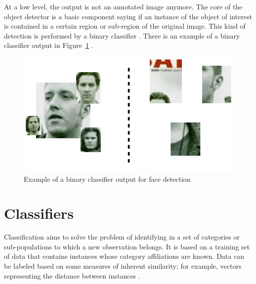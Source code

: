 \noindent At a low level, the output is not an annotated image anymore. The core of the object detector is a basic component saying if an instance of the object of interest is contained in a certain region or sub-region of the original image. This kind of detection is performed by a binary classifier \cite{DIN08}. There is an example of a binary classifier output in Figure~\ref{output_example_face_detection_binary_classifier} \cite{DIN08}.
\newline

\begin{figure}[!h]
\begin{center}
\noindent \includegraphics[scale=0.5]{figures/output_example_face_detection_binary_classifier} 
\newline
\caption{Example of a binary classifier output for face detection}
\label{output_example_face_detection_binary_classifier}
\end{center} 
\end{figure}

\section{Classifiers}

\vspace{\baselineskip}
\noindent Classification aims to solve the problem of identifying in a set of categories or sub-populations to which a new observation belongs. It is based on a training set of data that contains instances whose category affiliations are known. Data can be labeled based on some measures of inherent similarity; for example, vectors representing the distance between instances \cite{CLASS}.
\newline









